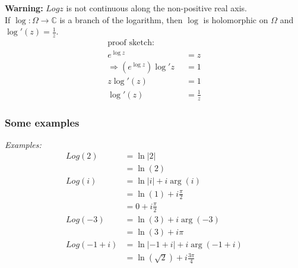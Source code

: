 \documentclass[a4paper, 11pt]{article}
\begin{document}
\noindent\textbf{Warning:} $Log z$ is not continuous along the non-positive real axis. \\

\noindent If $\log:\Omega\rightarrow\mathbb{C}$ is a branch of the logarithm, then $\log$ is holomorphic on $\Omega$ and $\log'(z) = \frac{1}{z}$. 
	\begin{align*}
		\text{proof sketch:} \quad \quad \quad & \\ 
			e^{\log z} &= z \\ 
			\Rightarrow (e^{\log z})\log' z &= 1 \\ 
			z\log'(z) &= 1 \\
			\log' (z) &= \frac{1}{z}
	\end{align*}

\subsubsection*{Some examples} 
\textit{Examples: } 
	\begin{align*}
		Log (2) &= \ln|2| \\ 
			&= \ln(2) \\ 
		Log (i) &= \ln|i|+i\arg(i) \\ 
			&=\ln(1) +i\frac{\pi}{2}\\
			&= 0 + i\frac{\pi}{2} \\ 
		Log (-3) &= \ln(3) + i\arg(-3) \\ 
			&= \ln(3)+ i\pi \\
		Log (-1+i) &= \ln|-1+i| + i\arg(-1+i)\\
			&= \ln(\sqrt{2})+i\frac{3\pi}{4} 
	\end{align*}



































	
\end{document}
